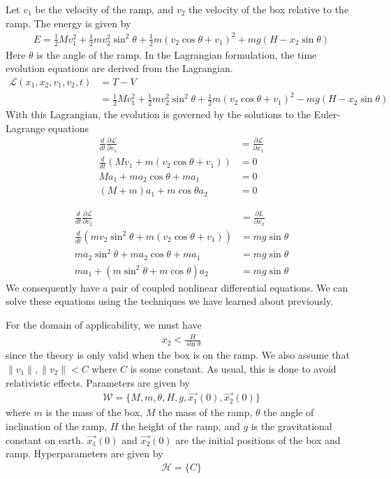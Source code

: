 \documentclass[book.tex]{subfiles}
\begin{document}
Let $v_1$ be the velocity of the ramp, and $v_2$ the velocity of the box relative to the ramp. The energy is given by
\begin{align}
E = \frac{1}{2}Mv_1^2 + \frac{1}{2}mv_2^2 \sin^2 \theta + \frac{1}{2} m(v_2 \cos \theta + v_1)^2 + mg(H - x_2 \sin \theta)
\label{ramp_energy}
\end{align}
Here $\theta$ is the angle of the ramp. In the Lagrangian formulation, the time evolution equations are derived from the Lagrangian.
\begin{align}
\mathcal{L}(x_1, x_2, v_1, v_2, t) &= T - V\\
&= \frac{1}{2}Mv_1^2 + \frac{1}{2}mv_2^2 \sin^2 \theta + \frac{1}{2} m(v_2 \cos \theta + v_1)^2  - mg(H - x_2 \sin \theta)
\end{align}
With this Lagrangian, the evolution is governed by the solutions to the Euler-Lagrange equations
\begin{align}
    \frac{d}{dt} \frac{\partial \mathcal{L}}{\partial v_1} &= \frac{\partial \mathcal{L}}{\partial x_1} \\
    \frac{d}{dt} \left ( Mv_1 + m(v_2\cos \theta +v_1) \right ) &= 0 \\
    M a_1 + ma_2 \cos \theta + m a_1 &= 0 \\
    (M + m) a_1 + m \cos \theta a_2 &= 0
\label{ramp:euler:lagrange}
\end{align}

\begin{align}
\frac{d}{dt} \frac{\partial \mathcal{L}}{\partial v_2} &= \frac{\partial L}{\partial x_2} \\
\frac{d}{dt} \left ( m v_2 \sin^2 \theta + m(v_2 \cos \theta + v_1) \right ) &= mg\sin \theta \\
m a_2 \sin^2 \theta + m a_2 \cos \theta + m a_1  &= mg \sin \theta \\
m a_1 + (m \sin^2 \theta + m \cos \theta) a_2 &= mg \sin \theta
\end{align}
We consequently have a pair of coupled nonlinear differential equations. We can solve these equations using the techniques we have learned about previously.

For the domain of applicability, we must have 
\begin{align}
x_2 < \frac{H}{\sin \theta}
\end{align}
since the theory is only valid when the box is on the ramp. We also assume that $\|v_1\|, \|v_2\| < C$ where $C$ is some constant. As usual, this is done to avoid relativistic effects.
Parameters are given by
\begin{align}\mathcal{W} = \{M, m, \theta, H, g, \vec{x_1}(0), \vec{x_2}(0)\}\end{align}
where $m$ is the mass of the box, $M$ the mass of the ramp, $\theta$ the angle of inclination of the ramp, $H$ the height of the ramp, and $g$ is the gravitational constant on earth. $\vec{x_1}(0)$ and $\vec{x_2}(0)$ are the initial positions of the box and ramp.
Hyperparameters are given by
\begin{align}\mathcal{H} = \{C\}\end{align}
\end{document}
